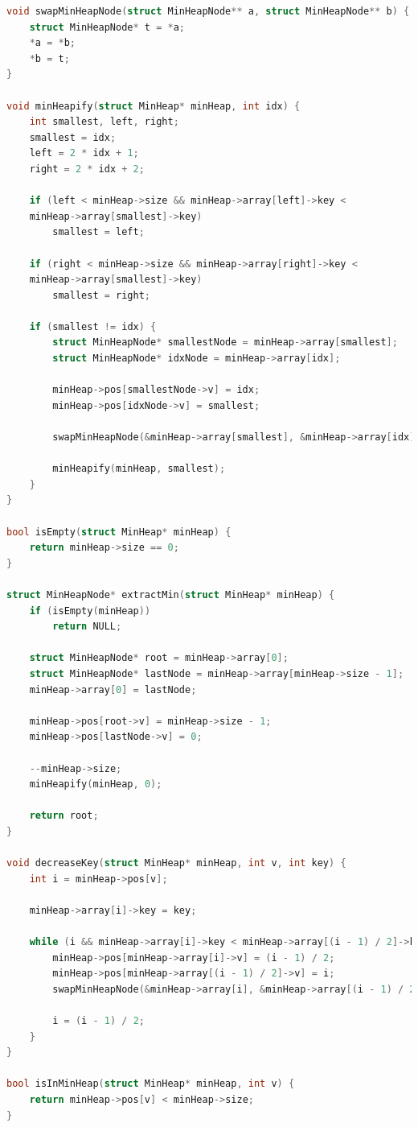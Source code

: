 \documentclass[a4paper, 10pt, twocolumn]{article}
\begin{document}
\begin{lstlisting}[language=C++, caption={C++ code for Efficient Prim's  Algorithm}]
void swapMinHeapNode(struct MinHeapNode** a, struct MinHeapNode** b) {
    struct MinHeapNode* t = *a;
    *a = *b;
    *b = t;
}

void minHeapify(struct MinHeap* minHeap, int idx) {
    int smallest, left, right;
    smallest = idx;
    left = 2 * idx + 1;
    right = 2 * idx + 2;

    if (left < minHeap->size && minHeap->array[left]->key < 
    minHeap->array[smallest]->key)
        smallest = left;

    if (right < minHeap->size && minHeap->array[right]->key < 
    minHeap->array[smallest]->key)
        smallest = right;

    if (smallest != idx) {
        struct MinHeapNode* smallestNode = minHeap->array[smallest];
        struct MinHeapNode* idxNode = minHeap->array[idx];

        minHeap->pos[smallestNode->v] = idx;
        minHeap->pos[idxNode->v] = smallest;

        swapMinHeapNode(&minHeap->array[smallest], &minHeap->array[idx]);

        minHeapify(minHeap, smallest);
    }
}

bool isEmpty(struct MinHeap* minHeap) {
    return minHeap->size == 0;
}

struct MinHeapNode* extractMin(struct MinHeap* minHeap) {
    if (isEmpty(minHeap))
        return NULL;

    struct MinHeapNode* root = minHeap->array[0];
    struct MinHeapNode* lastNode = minHeap->array[minHeap->size - 1];
    minHeap->array[0] = lastNode;

    minHeap->pos[root->v] = minHeap->size - 1;
    minHeap->pos[lastNode->v] = 0;

    --minHeap->size;
    minHeapify(minHeap, 0);

    return root;
}

void decreaseKey(struct MinHeap* minHeap, int v, int key) {
    int i = minHeap->pos[v];

    minHeap->array[i]->key = key;

    while (i && minHeap->array[i]->key < minHeap->array[(i - 1) / 2]->key) {
        minHeap->pos[minHeap->array[i]->v] = (i - 1) / 2;
        minHeap->pos[minHeap->array[(i - 1) / 2]->v] = i;
        swapMinHeapNode(&minHeap->array[i], &minHeap->array[(i - 1) / 2]);

        i = (i - 1) / 2;
    }
}

bool isInMinHeap(struct MinHeap* minHeap, int v) {
    return minHeap->pos[v] < minHeap->size;
}


\end{lstlisting}
\end{document}
